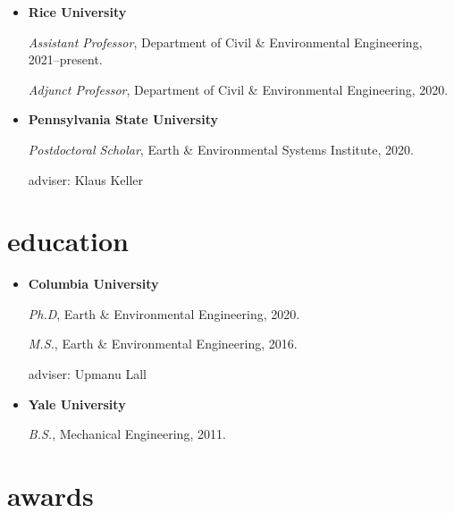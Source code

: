 \documentclass[10pt,oneside]{article}
\begin{document}
\mbox{}\vspace{-\dimexpr\baselineskip\relax}

\begin{itemize}[label={}]

  \item \textbf{Rice University}

        \textit{Assistant Professor}, Department of Civil \& Environmental Engineering, 2021--present.


        \textit{Adjunct Professor}, Department of Civil \& Environmental Engineering, 2020.



  \item \textbf{Pennsylvania State University}

        \textit{Postdoctoral Scholar}, Earth \& Environmental Systems Institute, 2020.

        adviser: Klaus Keller



\end{itemize}


\section{\color{BrickRed}education}

\mbox{}\vspace{-\dimexpr\baselineskip\relax}

\begin{itemize}[label={}]

  \item \textbf{Columbia University}

        \textit{Ph.D}, Earth \& Environmental Engineering, 2020.

        \textit{M.S.}, Earth \& Environmental Engineering, 2016.


        adviser: Upmanu Lall


  \item \textbf{Yale University}

        \textit{B.S.}, Mechanical Engineering, 2011.



\end{itemize}


\section{\color{BrickRed}awards}
\end{document}
